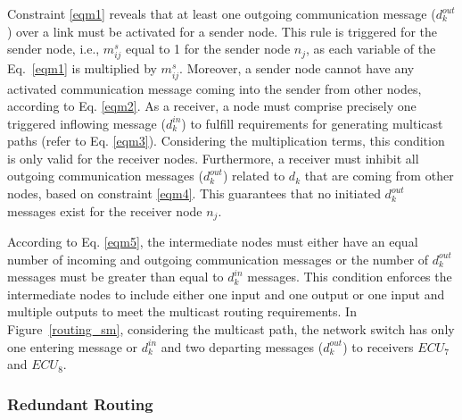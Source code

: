      Constraint \eqref{eqm1} reveals that at least one outgoing communication message ($d_k^{out}$) over a link must be activated for a sender node. This rule is triggered for the sender node, i.e., $m_{ij}^{s}$ equal to 1 for the sender node $n_j$, as each variable of the Eq.~\eqref{eqm1} is multiplied by $m_{ij}^{s}$. Moreover, a sender node cannot have any activated communication message coming into the sender from other nodes, according to Eq. \eqref{eqm2}. 
     As a receiver, a node must comprise precisely one triggered inflowing message ($d_k^{in}$) to fulfill requirements for generating multicast paths (refer to Eq. \eqref{eqm3}). Considering the multiplication terms, this condition is only valid for the receiver nodes.
     Furthermore, a receiver must inhibit all outgoing communication messages ($d_k^{out}$) related to $d_k$ that are coming from other nodes, based on constraint \eqref{eqm4}. This guarantees that no initiated $d_k^{out}$ messages exist for the receiver node $n_j$. 
     
     According to Eq. \eqref{eqm5}, the intermediate nodes must either have an equal number of incoming and outgoing communication messages or the number of $d_k^{out}$ messages must be greater than equal to $d_k^{in}$ messages. This condition enforces the intermediate nodes to include either one input and one output or one input and multiple outputs to meet the multicast routing requirements. In Figure~\ref{routing_sm}, considering the multicast path, the network switch has only one entering message or $d_k^{in}$ and two departing messages ($d_k^{out}$) to receivers $ECU_7$ and $ECU_8$.   
     

	
    \subsubsection{Redundant Routing}
    
